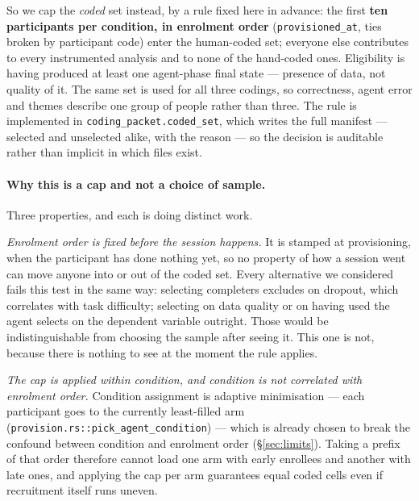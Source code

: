 \documentclass[11pt]{article}
\newcommand{\code}[1]{\texttt{#1}}
\begin{document}
So we cap the \emph{coded} set instead, by a rule fixed here in advance: the
first \textbf{ten participants per condition, in enrolment order}
(\code{provisioned\_at}, ties broken by participant code) enter the human-coded
set; everyone else contributes to every instrumented analysis and to none of the
hand-coded ones. Eligibility is having produced at least one agent-phase final
state --- presence of data, not quality of it. The same set is used for all three
codings, so correctness, agent error and themes describe one group of people
rather than three. The rule is implemented in
\code{coding\_packet.coded\_set}, which writes the full manifest --- selected and
unselected alike, with the reason --- so the decision is auditable rather than
implicit in which files exist.

\paragraph{Why this is a cap and not a choice of sample.} Three properties, and
each is doing distinct work.

\emph{Enrolment order is fixed before the session happens.} It is stamped at
provisioning, when the participant has done nothing yet, so no property of how a
session went can move anyone into or out of the coded set. Every alternative we
considered fails this test in the same way: selecting completers excludes on
dropout, which correlates with task difficulty; selecting on data quality or on
having used the agent selects on the dependent variable outright. Those would be
indistinguishable from choosing the sample after seeing it. This one is not,
because there is nothing to see at the moment the rule applies.

\emph{The cap is applied within condition, and condition is not correlated with
enrolment order.} Condition assignment is adaptive minimisation --- each
participant goes to the currently least-filled arm
(\code{provision.rs::pick\_agent\_condition}) --- which is already chosen to break
the confound between condition and enrolment order (\S\ref{sec:limits}). Taking a
prefix of that order therefore cannot load one arm with early enrollees and
another with late ones, and applying the cap per arm guarantees equal coded cells
even if recruitment itself runs uneven.
\end{document}
